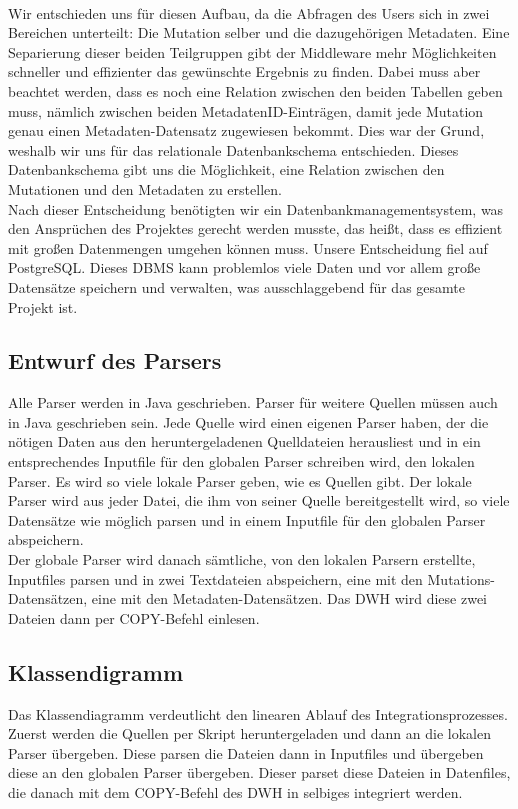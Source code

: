 \\
Wir entschieden uns für diesen Aufbau, da die Abfragen des Users sich in zwei Bereichen unterteilt: Die Mutation selber und die dazugehörigen Metadaten. Eine Separierung dieser beiden Teilgruppen gibt der Middleware mehr Möglichkeiten schneller und effizienter das gewünschte Ergebnis zu finden. Dabei muss aber beachtet werden, dass es noch eine Relation zwischen den beiden Tabellen geben muss, nämlich zwischen beiden MetadatenID-Einträgen, damit jede Mutation genau einen Metadaten-Datensatz zugewiesen bekommt. Dies war der Grund, weshalb wir uns für das relationale Datenbankschema entschieden. Dieses Datenbankschema gibt uns die Möglichkeit, eine Relation zwischen den Mutationen und den Metadaten zu erstellen.\\
Nach dieser Entscheidung benötigten wir ein Datenbankmanagementsystem, was den Ansprüchen des Projektes gerecht werden musste, das heißt, dass es effizient mit großen Datenmengen umgehen können muss. Unsere Entscheidung fiel auf PostgreSQL. Dieses DBMS kann problemlos viele Daten und vor allem große Datensätze speichern und verwalten, was ausschlaggebend für das gesamte Projekt ist.
\subsection{Entwurf des Parsers}
Alle Parser werden in Java geschrieben. Parser für weitere Quellen müssen auch in Java geschrieben sein. Jede Quelle wird einen eigenen Parser haben, der die nötigen Daten aus den heruntergeladenen Quelldateien herausliest und in ein entsprechendes Inputfile für den globalen Parser schreiben wird, den lokalen Parser. Es wird so viele lokale Parser geben, wie es Quellen gibt. Der lokale Parser wird aus jeder Datei, die ihm von seiner Quelle bereitgestellt wird, so viele Datensätze wie möglich parsen und in einem Inputfile für den globalen Parser abspeichern.\\
Der globale Parser wird danach sämtliche, von den lokalen Parsern erstellte, Inputfiles parsen und in zwei Textdateien abspeichern, eine mit den Mutations-Datensätzen, eine mit den Metadaten-Datensätzen. Das DWH wird diese zwei Dateien dann per COPY-Befehl einlesen. 
\subsection{Klassendigramm}
Das Klassendiagramm verdeutlicht den linearen Ablauf des Integrationsprozesses. Zuerst werden die Quellen per Skript heruntergeladen und dann an die lokalen Parser übergeben. Diese parsen die Dateien dann in Inputfiles und übergeben diese an den globalen Parser übergeben. Dieser parset diese Dateien in Datenfiles, die danach mit dem COPY-Befehl des DWH in selbiges integriert werden.
